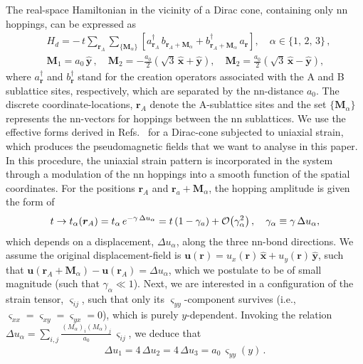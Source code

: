 \documentclass[aps,prb, onecolumn,nofootinbib,citeautoscript,10pt]{revtex4-2}
\newcommand{\bs}[1]{\boldsymbol{#1}}
\def \nn{\nonumber \\}
\begin{document}
The real-space Hamiltonian in the vicinity of a Dirac cone, containing only nn hoppings, can be expressed as
\begin{align}
\label{eqnn}
& H_d = -\, t \sum_{\bs r_A} \sum \limits_{ \lbrace \bs M_\alpha \rbrace } \left[ 
a_{\bs r_A}^\dagger \, b_{\bs r_A + \bs M_\alpha} + b_{\bs r_A + \bs M_\alpha }^\dagger \, a_{\bs r}
\right ], \quad \alpha \in \lbrace 1, \,2 ,\, 3 \rbrace \,,\nn
& \bs M_1 = a_0 \, \bs{\hat y}\,, \quad \bs M_2 = - \frac{a_0}{2} \left(\sqrt 3 \,\bs{\hat x} + \bs{\hat y}\right),
\quad \bs M_2 =  \frac{a_0}{2} \left(\sqrt 3 \,\bs{\hat x} - \bs{\hat y}\right),
\end{align}
where $a^\dagger_{\bs r}$ and $b ^\dagger _{\bs r}$ stand for the creation operators associated with the A and B sublattice sites, respectively, which are separated by the nn-distance $a_0$. The discrete coordinate-locations, $\bs r_A$ denote the A-sublattice sites and the set $\lbrace \bs M_\alpha \rbrace$ represents the nn-vectors for hoppings between the nn sublattices. We use the effective forms derived in Refs.~\cite{neto-strain-graphene, strained-dirac-franz} for a Dirac-cone subjected to uniaxial strain, which produces the pseudomagnetic fields that we want to analyse in this paper. In this procedure, the uniaxial strain pattern is incorporated in the system through a modulation of the nn hoppings into a  smooth function of the spatial coordinates. For the positions $\bs r_A $ and $\bs r_a + \bs M_\alpha $, the hopping amplitude is given the form of 
\begin{align}
t \rightarrow t_{\alpha}(\bs r_A) 
 = t_\alpha\, e^{-\gamma \,\Delta u_\alpha }
=  t  \left ( 1 -  \gamma_a \right)
 + \order{ \gamma _\alpha^2 } \,, \quad \gamma_\alpha \equiv \gamma\, \Delta u_\alpha, 
\end{align}
which depends on a displacement, $ \Delta u_{\alpha}$, along the three nn-bond directions. We assume the original displacement-field is $\bs u (\bs r) = u_x (\bs r)  \, \bs {\hat x} + u_y (\bs r) \, \bs {\hat y}$, such that $\bs u ({\bs r_A} + {}\bs M_\alpha) - \bs u (\bs r_A) = \Delta u_\alpha $, which we postulate to be of small magnitude (such that $\gamma_\alpha \ll 1 $).
Next, we are interested in a configuration of the strain tensor, $\varsigma_{ij}$, such that only its $\varsigma_{yy}$-component survives (i.e., $ \varsigma_{xx} = \varsigma_{xy} = \varsigma_{yx} = 0 $), which is purely $y$-dependent. Invoking the relation $\Delta u_{\alpha} = \sum_{i, j} \frac{ \left(M_\alpha \right)_i \left( M_\alpha\right)_j } {a_0}\,\varsigma_{ij}$, we deduce that
\begin{align}
\Delta u_1 = 4\, \Delta u_2 = 4 \, \Delta u_3 = a_0\, \varsigma_{yy}  (y)\,.
\end{align}
\end{document}
